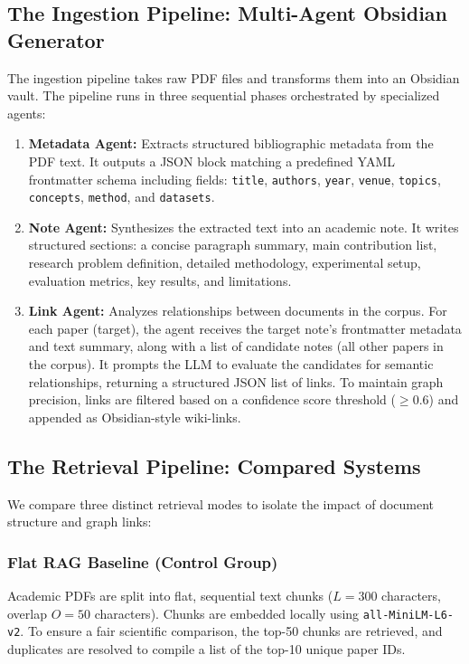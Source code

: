 \documentclass[11pt, a4paper, oneside]{article}
\begin{document}
\subsection{The Ingestion Pipeline: Multi-Agent Obsidian Generator}
The ingestion pipeline takes raw PDF files and transforms them into an Obsidian vault. The pipeline runs in three sequential phases orchestrated by specialized agents:
\begin{enumerate}
    \item \textbf{Metadata Agent:} Extracts structured bibliographic metadata from the PDF text. It outputs a JSON block matching a predefined YAML frontmatter schema including fields: \texttt{title}, \texttt{authors}, \texttt{year}, \texttt{venue}, \texttt{topics}, \texttt{concepts}, \texttt{method}, and \texttt{datasets}.
    \item \textbf{Note Agent:} Synthesizes the extracted text into an academic note. It writes structured sections: a concise paragraph summary, main contribution list, research problem definition, detailed methodology, experimental setup, evaluation metrics, key results, and limitations.
    \item \textbf{Link Agent:} Analyzes relationships between documents in the corpus. For each paper (target), the agent receives the target note's frontmatter metadata and text summary, along with a list of candidate notes (all other papers in the corpus). It prompts the LLM to evaluate the candidates for semantic relationships, returning a structured JSON list of links. To maintain graph precision, links are filtered based on a confidence score threshold ($\ge 0.6$) and appended as Obsidian-style wiki-links.
\end{enumerate}

\subsection{The Retrieval Pipeline: Compared Systems}
We compare three distinct retrieval modes to isolate the impact of document structure and graph links:

\subsubsection{Flat RAG Baseline (Control Group)}
Academic PDFs are split into flat, sequential text chunks ($L=300$ characters, overlap $O=50$ characters). Chunks are embedded locally using \texttt{all-MiniLM-L6-v2}. To ensure a fair scientific comparison, the top-50 chunks are retrieved, and duplicates are resolved to compile a list of the top-10 unique paper IDs.
\end{document}
